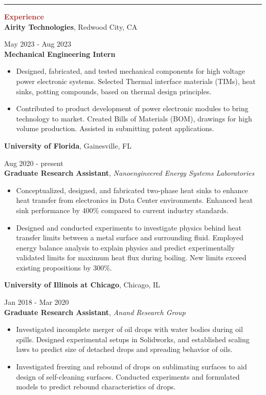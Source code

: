 \documentclass[11pt, letterpaper]{article}
\begin{document}
\noindent \rule[2pt]{\textwidth}{0.5pt}
\noindent \textbf{\large \textcolor{Brown}{Experience}}\vspace{4pt}\\
\textbf{Airity Technologies}, Redwood City, CA \hfill \raggedright{May 2023 - Aug 2023}\\
\textbf{Mechanical Engineering Intern}
\begin{itemize}[leftmargin=*]
\setlength\itemsep{-2pt}
\vspace{-5pt}
\item Designed, fabricated, and tested mechanical components for high voltage power electronic systems. Selected Thermal interface materials (TIMs), heat sinks, potting compounds, based on thermal design principles.
\item Contributed to product development of power electronic modules to bring technology to market. Created Bills of Materials (BOM), drawings for high volume production. Assisted in submitting patent applications.
\end{itemize}
\textbf{University of Florida}, Gainesville, FL \hfill \raggedright{Aug 2020 - present}\\
\textbf{Graduate Research Assistant}, \textit{Nanoengineered Energy Systems Laboratories}
\begin{itemize}[leftmargin=*]
\setlength\itemsep{-2pt}
\vspace{-5pt}
\item Conceptualized, designed, and fabricated two-phase heat sinks to enhance heat transfer from electronics in Data Center environments. Enhanced heat sink performance by 400\% compared to current industry standards.
\item Designed and conducted experiments to investigate physics behind heat transfer limits between a metal surface and surrounding fluid. Employed energy balance analysis to explain physics and predict experimentally validated limits for maximum heat flux during boiling. New limits exceed existing propositions by 300\%.
\end{itemize}
\textbf{University of Illinois at Chicago}, Chicago, IL \hfill \raggedright{Jan 2018 - Mar 2020}\\
\textbf{Graduate Research Assistant}, \textit{Anand Research Group}
\begin{itemize}[leftmargin=*]
\setlength\itemsep{-2pt}
\vspace{-5pt}
\item Investigated incomplete merger of oil drops with water bodies during oil spills. Designed experimental setups in Solidworks, and established scaling laws to predict size of detached drops and spreading behavior of oils.
\item Investigated freezing and rebound of drops on sublimating surfaces to aid design of self-cleaning surfaces. Conducted experiments and formulated models to predict rebound characteristics of drops.
\end{itemize}
\end{document}
